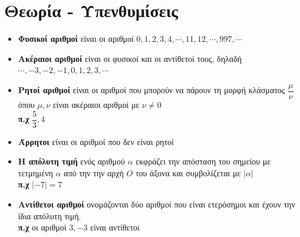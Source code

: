 \documentclass[a4paper,10pt]{report}
\begin{document}
\section*{Θεωρία - Υπενθυμίσεις \hfill \small{}}
\begin{itemize}
 \item \textbf{Φυσικοί αριθμοί} είναι οι αριθμοί $0,1,2,3,4,\cdots ,11,12,\cdots , 997, \cdots$
 \item \textbf{Ακέραιοι αριθμοί} είναι οι φυσικοί και οι αντίθετοί τους, δηλαδή $\cdots ,-3,-2,-1,0,1,2,3,\cdots$ 
 \item \textbf{Ρητοί αριθμοί} είναι οι αριθμοί που μπορούν να πάρουν τη μορφή κλάσματος $\dfrac{μ}{ν}$ 
        όπου $μ,ν$ είναι ακέραιοι αριθμοί με $ν\neq0$\\
        \textbf{π.χ} $\dfrac{5}{3},4$
 \item \textbf{Άρρητοι} είναι οι αριθμοί που δεν είναι ρητοί
 \item \textbf{Η απόλυτη τιμή} ενός αριθμού $α$ εκφράζει την απόσταση του σημείου με τετμημένη $α$ από την 
              την αρχή $Ο$ του άξονα και συμβολίζεται με $|α|$\\
       \textbf{π.χ} $|-7|=7$
\item \textbf{Αντίθετοι αριθμοί} ονομάζονται δύο αριθμοί που είναι ετερόσημοι και έχουν την ίδια απόλυτη τιμή.\\
       \textbf{π.χ} οι αριθμοί $ 3,-3 $ είναι αντίθετοι
\end{itemize}
\end{document}
